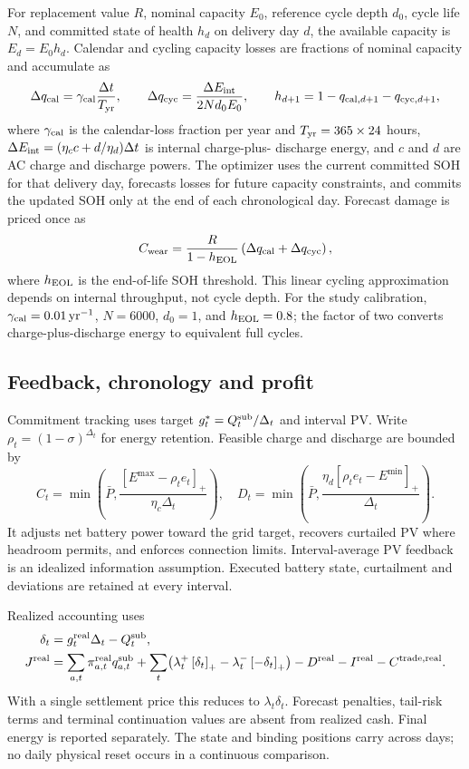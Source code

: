 \documentclass[11pt,a4paper]{article}
\newcommand{\pos}[1]{\left[#1\right]_+}
\begin{document}
For replacement value $R$, nominal capacity $E_0$, reference cycle depth $d_0$,
cycle life $N$, and committed state of health $h_d$ on delivery day $d$, the
available capacity is $E_d=E_0h_d$. Calendar and cycling capacity losses are
fractions of nominal capacity and accumulate as
\begin{equation}
\Delta q_{\rm cal}=\gamma_{\rm cal}\frac{\Delta t}{T_{\rm yr}},\qquad
\Delta q_{\rm cyc}=\frac{\Delta E_{\rm int}}
{2Nd_0E_0},\qquad
h_{d+1}=1-q_{{\rm cal},d+1}-q_{{\rm cyc},d+1},
\end{equation}
where $\gamma_{\rm cal}$ is the calendar-loss fraction per year and
$T_{\rm yr}=365\times24$ hours,
$\Delta E_{\rm int}=(\eta_c c+d/\eta_d)\Delta t$ is internal charge-plus-
discharge energy, and $c$ and $d$ are AC charge and discharge powers. The
optimizer uses the current committed SOH for that delivery day, forecasts
losses for future capacity constraints, and commits the updated SOH only at
the end of each chronological day. Forecast damage is priced once as
\begin{equation}
C_{\rm wear}=\frac{R}{1-h_{\rm EOL}}
\left(\Delta q_{\rm cal}+\Delta q_{\rm cyc}\right),
\end{equation}
where $h_{\rm EOL}$ is the end-of-life SOH threshold. This linear cycling
approximation depends on internal throughput, not cycle depth. For the study
calibration, $\gamma_{\rm cal}=0.01\,{\rm yr}^{-1}$, $N=6000$, $d_0=1$,
and $h_{\rm EOL}=0.8$; the factor of two converts charge-plus-discharge
energy to equivalent full cycles.
\subsection{Feedback, chronology and profit}
Commitment tracking uses target $g_t^*=Q_t^{\rm sub}/\Delta_t$ and interval PV.
Write $\rho_t=(1-\sigma)^{\Delta_t}$ for energy retention.
Feasible charge and discharge are bounded by
\begin{equation}
 C_t=\min\!\left(\bar P,\frac{\pos{E^{\max}-\rho_te_t}}{\eta_c\Delta_t}\right),
 \quad D_t=\min\!\left(\bar P,\frac{\eta_d\pos{\rho_te_t-E^{\min}}}{\Delta_t}\right).
\end{equation}
It adjusts net battery power toward the grid target, recovers curtailed PV
where headroom permits, and enforces connection limits. Interval-average PV feedback is an idealized information assumption.
Executed battery state, curtailment and deviations are retained at every interval.

Realized accounting uses
\begin{align}
 \delta_t&=g_t^{\rm real}\Delta_t-Q_t^{\rm sub},\\
 J^{\rm real}&=\sum_{a,t}\pi^{\rm real}_{a,t}q^{\rm sub}_{a,t}
 +\sum_t\bigl(\lambda_t^+\pos{\delta_t}-\lambda_t^-\pos{-\delta_t}\bigr)
 -D^{\rm real}-I^{\rm real}-C^{\rm trade,real}.
\end{align}
With a single settlement price this reduces to $\lambda_t\delta_t$.
Forecast penalties, tail-risk terms and terminal continuation values are absent
from realized cash. Final energy is reported separately. The state and binding
positions carry across days; no daily physical reset occurs in a continuous
comparison.
\end{document}
